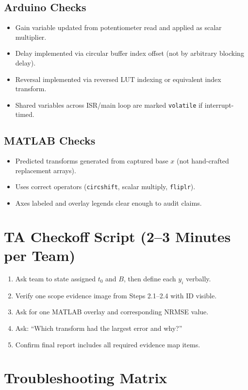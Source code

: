 \documentclass[11pt,letterpaper]{article}
\begin{document}
\subsection*{Arduino Checks}
\begin{itemize}[leftmargin=1.2em]
    \item Gain variable updated from potentiometer read and applied as scalar multiplier.
    \item Delay implemented via circular buffer index offset (not by arbitrary blocking delay).
    \item Reversal implemented via reversed LUT indexing or equivalent index transform.
    \item Shared variables across ISR/main loop are marked \texttt{volatile} if interrupt-timed.
\end{itemize}

\subsection*{MATLAB Checks}
\begin{itemize}[leftmargin=1.2em]
    \item Predicted transforms generated from captured base $x$ (not hand-crafted replacement arrays).
    \item Uses correct operators (\texttt{circshift}, scalar multiply, \texttt{fliplr}).
    \item Axes labeled and overlay legends clear enough to audit claims.
\end{itemize}

\section{TA Checkoff Script (2--3 Minutes per Team)}
\begin{enumerate}[leftmargin=1.4em]
    \item Ask team to state assigned $t_0$ and $B$, then define each $y_i$ verbally.
    \item Verify one scope evidence image from Steps 2.1--2.4 with ID visible.
    \item Ask for one MATLAB overlay and corresponding NRMSE value.
    \item Ask: ``Which transform had the largest error and why?''
    \item Confirm final report includes all required evidence map items.
\end{enumerate}

\section{Troubleshooting Matrix}
\end{document}
